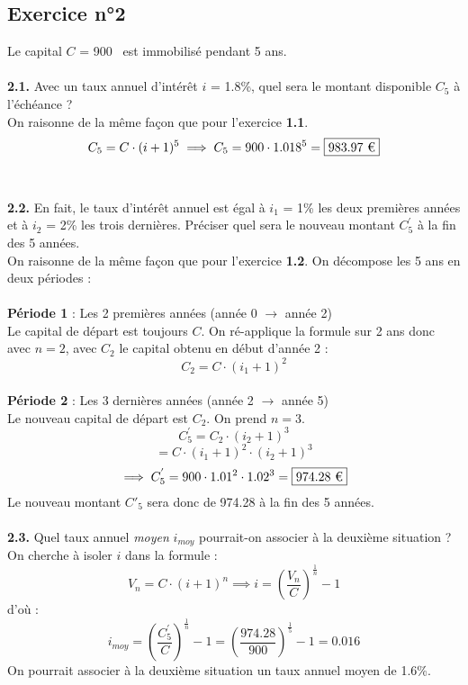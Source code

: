 \documentclass{article}
\begin{document}
\subsection{Exercice n°2}
\textcolor{exogris}{
Le capital $C$ = 900 \texteuro est immobilisé pendant 5 ans.
}
\\\\ \textcolor{exogris}{\textbf{2.1.}
Avec un taux annuel d’intérêt $i$ = 1.8\%, quel sera le montant disponible $C_5$ à l’échéance ?
}
\\%
On raisonne de la même façon que pour l'exercice \textbf{1.1}.
$$C_5 = C\cdot(i+1)^5 \implies C_5 = 900 \cdot 1.018^5 = \boxed{983.97\text{ \texteuro}}$$
\\%
\\%
\textcolor{exogris}{\textbf{2.2.}
En fait, le taux d’intérêt annuel est égal à $i_1$ = 1\% les deux premières années et à $i_2$ = 2\% les trois dernières. Préciser quel sera le nouveau montant $C^{'}_5$ à la fin des 5 années.
}
\\%
On raisonne de la même façon que pour l'exercice \textbf{1.2}.
On décompose les 5 ans en deux périodes :
\\\\\textbf{Période 1} : Les 2 premières années (année 0 $\rightarrow$ année 2)
\\Le capital de départ est toujours $C$. On ré-applique la formule sur 2 ans donc avec $n=2$, avec $C_2$ le capital obtenu en début d'année 2 :
$$C_2 = C \cdot (i_1+1)^2$$
\\\textbf{Période 2} : Les 3 dernières années (année 2 $\rightarrow$ année 5)
\\Le nouveau capital de départ est $C_2$. On prend $n = 3$.
$$C^{'}_5 = C_2\cdot(i_2+1)^3$$
$$= C\cdot(i_1+1)^2\cdot(i_2+1)^3$$
$$\implies C^{'}_5 = 900\cdot1.01^2\cdot1.02^3 = \boxed{974.28\text{ \texteuro}}$$
%
Le nouveau montant $C'_5$ sera donc de 974.28 \texteuro à la fin des 5 années.
\\%
\\%
\textcolor{exogris}{\textbf{2.3.}
Quel taux annuel \textit{moyen} $i_{moy}$ pourrait-on associer à la deuxième situation ?
}%
\\%
On cherche à isoler $i$ dans la formule : 
$$V_n = C\cdot(i+1)^n \implies i = \left(\dfrac{V_n}{C}\right)^{\frac{1}{n}}-1$$
d'où :
$$i_{moy} = \left(\dfrac{C^{'}_5}{C}\right)^{\frac{1}{n}}-1 = \left(\dfrac{974.28}{900}\right)^{\frac{1}{5}}-1 = \boxed{0.016}$$
On pourrait associer à la deuxième situation un taux annuel moyen de 1.6\%.
\end{document}
